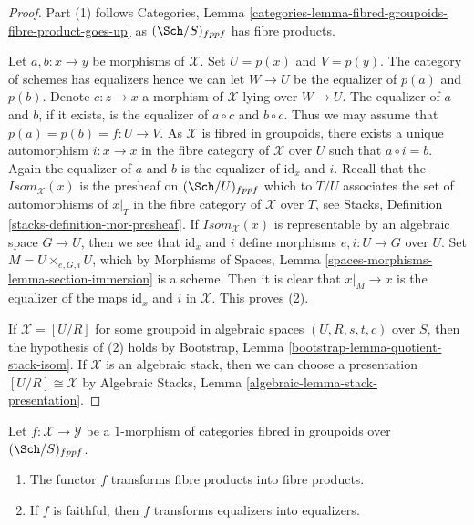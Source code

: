 \begin{proof}
Part (1) follows
Categories, Lemma \ref{categories-lemma-fibred-groupoids-fibre-product-goes-up}
as $(\Sch/S)_{fppf}$ has fibre products.

\medskip\noindent
Let $a, b : x \to y$ be morphisms of $\mathcal{X}$.
Set $U = p(x)$ and $V = p(y)$. The category of schemes has equalizers
hence we can let $W \to U$ be the equalizer of $p(a)$ and $p(b)$.
Denote $c : z \to x$ a morphism of $\mathcal{X}$ lying over $W \to U$.
The equalizer of $a$ and $b$, if it exists, is the equalizer of $a \circ c$
and $b \circ c$. Thus we may assume that $p(a) = p(b) = f : U \to V$.
As $\mathcal{X}$ is fibred in groupoids, there exists a unique automorphism
$i : x \to x$ in the fibre category of $\mathcal{X}$ over $U$ such that
$a \circ i = b$. Again the equalizer of $a$ and $b$ is the equalizer
of $\text{id}_x$ and $i$. Recall that the $\mathit{Isom}_\mathcal{X}(x)$
is the presheaf on $(\Sch/U)_{fppf}$ which to
$T/U$ associates the set of automorphisms of $x|_T$ in the fibre category
of $\mathcal{X}$ over $T$, see
Stacks, Definition \ref{stacks-definition-mor-presheaf}.
If $\mathit{Isom}_\mathcal{X}(x)$ is representable by an algebraic space
$G \to U$, then we see that $\text{id}_x$ and $i$ define morphisms
$e, i : U \to G$ over $U$. Set $M = U \times_{e, G, i} U$, which by
Morphisms of Spaces, Lemma \ref{spaces-morphisms-lemma-section-immersion}
is a scheme. Then it is clear that $x|_M \to x$ is the equalizer of
the maps $\text{id}_x$ and $i$ in $\mathcal{X}$.
This proves (2).

\medskip\noindent
If $\mathcal{X} = [U/R]$ for some groupoid in algebraic spaces
$(U, R, s, t, c)$ over $S$, then the hypothesis of (2) holds by
Bootstrap, Lemma \ref{bootstrap-lemma-quotient-stack-isom}.
If $\mathcal{X}$ is an algebraic stack, then we can choose a
presentation $[U/R] \cong \mathcal{X}$ by
Algebraic Stacks, Lemma \ref{algebraic-lemma-stack-presentation}.
\end{proof}

\begin{lemma}
\label{lemma-fibre-products-morphism}
Let $f : \mathcal{X} \to \mathcal{Y}$ be a $1$-morphism of categories
fibred in groupoids over $(\Sch/S)_{fppf}$.
\begin{enumerate}
\item The functor $f$ transforms fibre products into fibre products.
\item If $f$ is faithful, then $f$ transforms equalizers into equalizers.
\end{enumerate}
\end{lemma}


